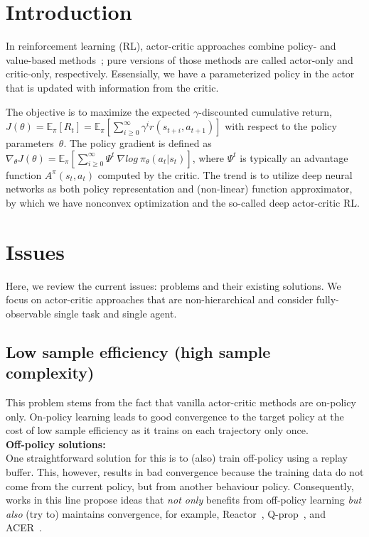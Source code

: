 \section{Introduction}
In reinforcement learning (RL),
actor-critic approaches combine policy- and value-based methods~\cite{6392457};
pure versions of those methods are called actor-only and critic-only, respectively.
Essensially, we have a parameterized policy in the actor that is
updated with information from the critic.

The objective is to maximize the expected $\gamma$-discounted cumulative return,
$J(\theta) = \mathbb{E}_{\pi} [R_t] = \mathbb{E}_{\pi} [ \sum_{i \ge 0}^{\infty} \gamma^i r(s_{t+i}, a_{t+1}) ]$
with respect to the policy parameters~$\theta$.
The policy gradient is defined as
$\nabla_{\theta} J(\theta) = \mathbb{E}_{\pi} [ \sum_{i \ge 0}^{\infty} \Psi^t~\nabla log~\pi_{\theta} (a_t | s_t) ]$,
where $\Psi^t$ is typically an advantage function $A^{\pi}(s_t,a_t)$ computed by the critic.
The trend is to utilize deep neural networks as both policy representation and
(non-linear) function approximator, by which we have nonconvex optimization and
the so-called deep actor-critic RL.

\section{Issues}
Here, we review the current issues: problems and their existing solutions.
We focus on actor-critic approaches that are non-hierarchical and
consider fully-observable single task and single agent.

\subsection{Low sample efficiency (high sample complexity)}
This problem stems from the fact that vanilla actor-critic methods are on-policy only.
On-policy learning leads to good convergence to the target policy at
the cost of low sample efficiency as it trains on each trajectory only once.\\

\noindent
\textbf{Off-policy solutions:}\\
One straightforward solution for this is to (also) train off-policy using a replay buffer.
This, however, results in bad convergence because the training data
do not come from the current policy, but from another behaviour policy.
Consequently, works in this line propose ideas that \emph{not only} benefits from
off-policy learning \emph{but also} (try to) maintains convergence,
for example, Reactor~\cite{Gruslys2018}, Q-prop~\cite{}, and ACER~\cite{}.

